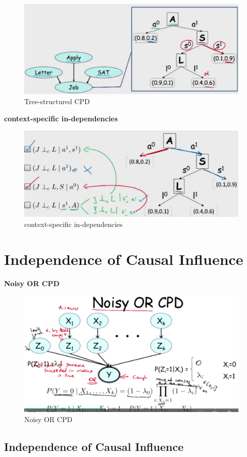 \documentclass{book}
\begin{document}
\begin{figure}[h]
\centering
\includegraphics[width=0.7\linewidth]{./figures/treeCPD}
\caption{Tree-structured CPD}
\label{fig:treeCPD}
\end{figure}

\textbf{context-specific in-dependencies}

\begin{figure}[h]
\centering
\includegraphics[width=0.7\linewidth]{./figures/contextCPD}
\caption{context-specific in-dependencies}
\label{fig:contextCPD}
\end{figure}

\section{Independence of Causal Influence}

\textbf{Noisy OR CPD}

\begin{figure}[h]
\centering
\includegraphics[width=0.7\linewidth]{./figures/noisyCPD}
\caption{Noisy OR CPD}
\label{fig:noisyCPD}
\end{figure}

\subsection{Independence of Causal Influence}
\end{document}
